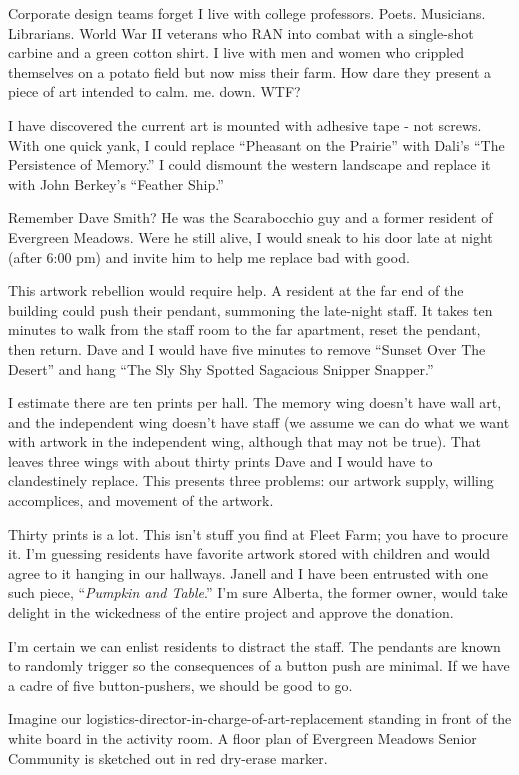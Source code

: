 \documentclass[
  letterpaper,
  DIV=11,
  numbers=noendperiod]{scrreprt}
\begin{document}
Corporate design teams forget I live with college professors. Poets.
Musicians. Librarians. World War II veterans who RAN into combat with a
single-shot carbine and a green cotton shirt. I live with men and women
who crippled themselves on a potato field but now miss their farm. How
dare they present a piece of art intended to calm. me. down. WTF?

I have discovered the current art is mounted with adhesive tape - not
screws. With one quick yank, I could replace ``Pheasant on the Prairie''
with Dali's ``The Persistence of Memory.'' I could dismount the western
landscape and replace it with John Berkey's ``Feather Ship.''

Remember Dave Smith? He was the Scarabocchio guy and a former resident
of Evergreen Meadows. Were he still alive, I would sneak to his door
late at night (after 6:00 pm) and invite him to help me replace bad with
good.

This artwork rebellion would require help. A resident at the far end of
the building could push their pendant, summoning the late-night staff.
It takes ten minutes to walk from the staff room to the far apartment,
reset the pendant, then return. Dave and I would have five minutes to
remove ``Sunset Over The Desert'' and hang ``The Sly Shy Spotted
Sagacious Snipper Snapper.''

I estimate there are ten prints per hall. The memory wing doesn't have
wall art, and the independent wing doesn't have staff (we assume we can
do what we want with artwork in the independent wing, although that may
not be true). That leaves three wings with about thirty prints Dave and
I would have to clandestinely replace. This presents three problems: our
artwork supply, willing accomplices, and movement of the artwork.

Thirty prints is a lot. This isn't stuff you find at Fleet Farm; you
have to procure it. I'm guessing residents have favorite artwork stored
with children and would agree to it hanging in our hallways. Janell and
I have been entrusted with one such piece, ``\emph{Pumpkin and Table}.''
I'm sure Alberta, the former owner, would take delight in the wickedness
of the entire project and approve the donation.

I'm certain we can enlist residents to distract the staff. The pendants
are known to randomly trigger so the consequences of a button push are
minimal. If we have a cadre of five button-pushers, we should be good to
go.

Imagine our logistics-director-in-charge-of-art-replacement standing in
front of the white board in the activity room. A floor plan of Evergreen
Meadows Senior Community is sketched out in red dry-erase marker.
\end{document}
